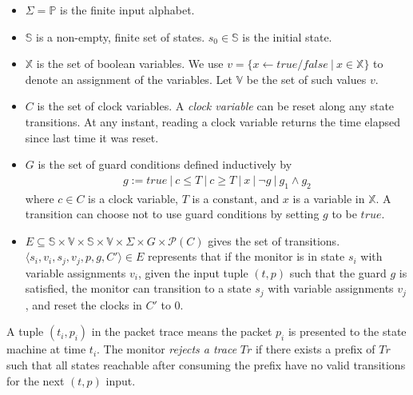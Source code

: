 \begin{definition}
  \begin{itemize}
    \item $\Sigma = \mathbb{P}$ is the finite input alphabet.

    \item $\mathbb{S}$ is a non-empty, finite set of states. $s_0 \in
      \mathbb{S}$ is the initial state.

    \item $\mathbb{X}$ is the set of boolean variables. We use $v = \{x
      \leftarrow true/false\ |\ x \in \mathbb{X}\}$ to denote an assignment of
      the variables. Let $\mathbb{V}$ be the set of such values $v$. 

    \item $C$ is the set of clock variables. A \textit{clock variable} can be
      reset along any state transitions. At any instant, reading a clock
      variable returns the time elapsed since last time it was reset.

    \item $G$ is the set of guard conditions defined inductively by
      \begin{align*}
        g := true\ |\ c \le T\ |\ c \ge T\ |\ x\ |\ \neg g\ |\ g_1 \land g_2
      \end{align*}%
      where $c \in C$ is a clock variable, $T$ is a constant, and $x$ is a variable in $\mathbb{X}$. 
      A transition can choose not to use guard conditions by setting $g$ to be $true$.

    \item $E \subseteq \mathbb{S} \times \mathbb{V} \times \mathbb{S} \times
      \mathbb{V} \times \Sigma \times  G \times \mathscr{P}(C)$ gives the set of
      transitions.\\ $\langle s_i, v_i, s_j, v_j, p, g, C'\rangle \in E$
      represents that if the monitor is in state $s_i$ with variable assignments
      $v_i$, given the input tuple $(t, p)$ such that the guard $g$ is
      satisfied, the monitor can transition to a state $s_j$ with variable assignments
      $v_j$, and reset the clocks in $C'$ to 0.
  \end{itemize}
  \label{def:sm}
\end{definition}

A tuple $(t_i, p_i)$ in the packet trace means the packet $p_i$ is presented to
the state machine at time $t_i$. The monitor {\it rejects a trace} $Tr$ if there
exists a prefix of $Tr$ such that all states reachable after consuming the
prefix have no valid transitions for the next $(t, p)$ input.

